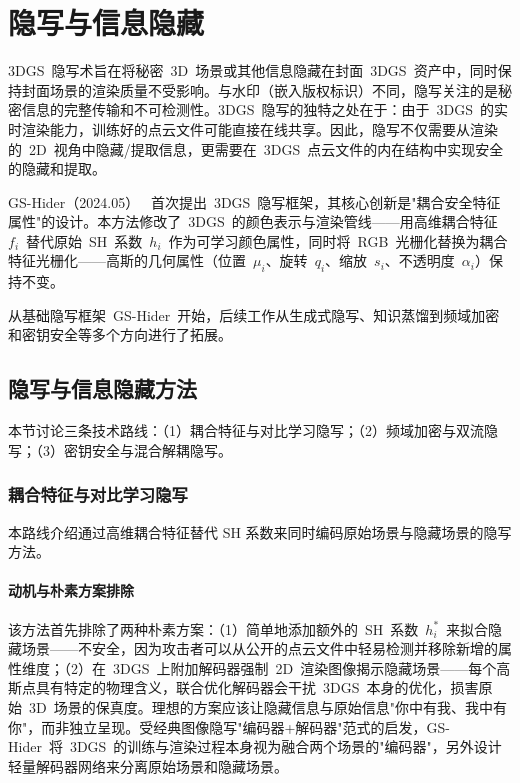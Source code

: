 \section{隐写与信息隐藏}
\label{sec:21_3}

3DGS~隐写术旨在将秘密~3D~场景或其他信息隐藏在封面~3DGS~资产中，同时保持封面场景的渲染质量不受影响。与水印（嵌入版权标识）不同，隐写关注的是秘密信息的完整传输和不可检测性。3DGS~隐写的独特之处在于：由于~3DGS~的实时渲染能力，训练好的点云文件可能直接在线共享。因此，隐写不仅需要从渲染的~2D~视角中隐藏/提取信息，更需要在~3DGS~点云文件的内在结构中实现安全的隐藏和提取。

GS-Hider（2024.05）~\cite{2405_15118} 首次提出~3DGS~隐写框架，其核心创新是"耦合安全特征属性"的设计。本方法修改了~3DGS~的颜色表示与渲染管线——用高维耦合特征~$f_i$~替代原始~SH~系数~$h_i$~作为可学习颜色属性，同时将~RGB~光栅化替换为耦合特征光栅化——高斯的几何属性（位置~$\mu_i$、旋转~$q_i$、缩放~$s_i$、不透明度~$\alpha_i$）保持不变。

从基础隐写框架~GS-Hider~开始，后续工作从生成式隐写、知识蒸馏到频域加密和密钥安全等多个方向进行了拓展。

\subsection{隐写与信息隐藏方法}
\label{ss:21_3}

本节讨论三条技术路线：（1）耦合特征与对比学习隐写；（2）频域加密与双流隐写；（3）密钥安全与混合解耦隐写。

\subsubsection{耦合特征与对比学习隐写}

本路线介绍通过高维耦合特征替代 SH 系数来同时编码原始场景与隐藏场景的隐写方法。

\paragraph{动机与朴素方案排除}该方法首先排除了两种朴素方案：（1）简单地添加额外的~SH~系数~$h^*_i$~来拟合隐藏场景——不安全，因为攻击者可以从公开的点云文件中轻易检测并移除新增的属性维度；（2）在~3DGS~上附加解码器强制~2D~渲染图像揭示隐藏场景——每个高斯点具有特定的物理含义，联合优化解码器会干扰~3DGS~本身的优化，损害原始~3D~场景的保真度。理想的方案应该让隐藏信息与原始信息"你中有我、我中有你"，而非独立呈现。受经典图像隐写"编码器+解码器"范式的启发，GS-Hider~将~3DGS~的训练与渲染过程本身视为融合两个场景的"编码器"，另外设计轻量解码器网络来分离原始场景和隐藏场景。

